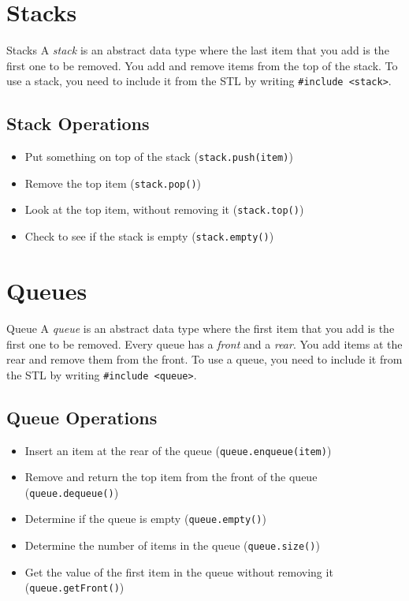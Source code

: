 \documentclass[class=article, crop=false]{standalone}
\begin{document}
  \tableofcontents
  \newpage
  \section{Stacks}
  \begin{definition}{Stacks}
    A \emph{stack} is an abstract data type where the last item that you add is the first one to be removed. You add and remove items from the top of the stack. To use a stack, you need to include it from the STL by writing \texttt{\#include <stack>}.
  \end{definition}
  \subsection{Stack Operations}
  \begin{itemize}
    \item Put something on top of the stack (\texttt{stack.push(item)})
    \item Remove the top item (\texttt{stack.pop()})
    \item Look at the top item, without removing it (\texttt{stack.top()})
    \item Check to see if the stack is empty (\texttt{stack.empty()})
  \end{itemize}
  \section{Queues}
  \begin{definition}{Queue}
    A \emph{queue} is an abstract data type where the first item that you add is the first one to be removed. Every queue has a \emph{front} and a \emph{rear}. You add items at the rear and remove them from the front. To use a queue, you need to include it from the STL by writing \texttt{\#include <queue>}.
  \end{definition}
  \subsection{Queue Operations}
  \begin{itemize}
    \item Insert an item at the rear of the queue (\texttt{queue.enqueue(item)})
    \item Remove and return the top item from the front of the queue (\texttt{queue.dequeue()})
    \item Determine if the queue is empty (\texttt{queue.empty()})
    \item Determine the number of items in the queue (\texttt{queue.size()})
    \item Get the value of the first item in the queue without removing it (\texttt{queue.getFront()})
  \end{itemize}
\end{document}
